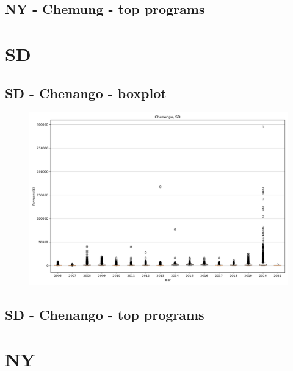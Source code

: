\subsection*{NY - Chemung - top programs}

\newpage
\section*{SD}
\subsection*{SD - Chenango - boxplot}
\begin{figure}[h]
\centering
\includegraphics[width=7in]{../output/boxplots/counties/Chenango-SD_boxplot.png}
\end{figure}


\subsection*{SD - Chenango - top programs}

\newpage
\section*{NY}
